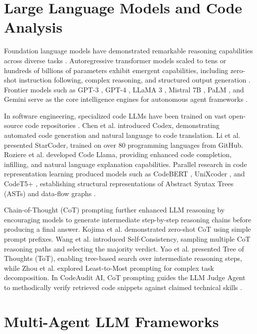\section{Large Language Models and Code Analysis}

Foundation language models have demonstrated remarkable reasoning capabilities across diverse tasks \cite{ref9, ref30, ref16, ref17, ref56, ref18}. Autoregressive transformer models scaled to tens or hundreds of billions of parameters exhibit emergent capabilities, including zero-shot instruction following, complex reasoning, and structured output generation \cite{ref9, ref52, ref42}. Frontier models such as GPT-3 \cite{ref9}, GPT-4 \cite{ref17}, LLaMA 3 \cite{ref16}, Mistral 7B \cite{ref51}, PaLM \cite{ref30}, and Gemini \cite{ref55} serve as the core intelligence engines for autonomous agent frameworks \cite{ref38, ref64, ref44}.

In software engineering, specialized code LLMs have been trained on vast open-source code repositories \cite{ref3, ref20, ref53, ref54, ref58}. Chen et al. \cite{ref20} introduced Codex, demonstrating automated code generation and natural language to code translation. Li et al. \cite{ref53} presented StarCoder, trained on over 80 programming languages from GitHub. Roziere et al. \cite{ref54} developed Code Llama, providing enhanced code completion, infilling, and natural language explanation capabilities. Parallel research in code representation learning produced models such as CodeBERT \cite{ref37}, UniXcoder \cite{ref50}, and CodeT5+ \cite{ref58}, establishing structural representations of Abstract Syntax Trees (ASTs) and data-flow graphs \cite{ref3, ref37, ref50}.

Chain-of-Thought (CoT) prompting \cite{ref42} further enhanced LLM reasoning by encouraging models to generate intermediate step-by-step reasoning chains before producing a final answer. Kojima et al. \cite{ref52} demonstrated zero-shot CoT using simple prompt prefixes. Wang et al. \cite{ref57} introduced Self-Consistency, sampling multiple CoT reasoning paths and selecting the majority verdict. Yao et al. \cite{ref59} presented Tree of Thoughts (ToT), enabling tree-based search over intermediate reasoning steps, while Zhou et al. \cite{ref60} explored Least-to-Most prompting for complex task decomposition. In CodeAudit AI, CoT prompting guides the LLM Judge Agent to methodically verify retrieved code snippets against claimed technical skills \cite{ref10, ref25, ref42, ref29}.

\section{Multi-Agent LLM Frameworks}

